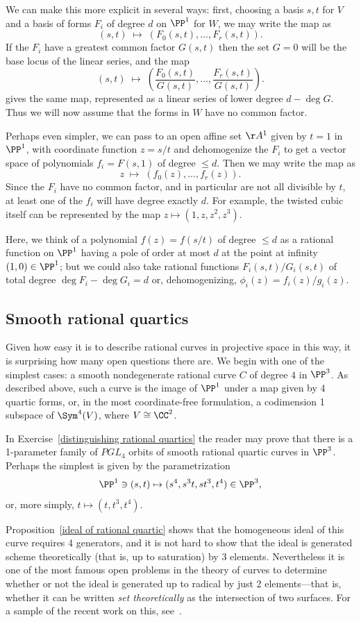 We can make this more explicit in several ways: first, choosing a basis $s,t$ for $V$ and a basis of forms $F_i$ of degree $d$ on $\PP^1$ for $W$, we may write the map as
$$
(s,t) \; \mapsto \; \left(F_0(s,t), \dots, F_r(s,t)\right).
$$
If the $F_i$ have a greatest common factor $G(s,t)$ then the set $G=0$ will be the base locus
of the linear series, and the map
$$
(s,t) \; \mapsto \; \left( \frac{F_0(s,t)}{G(s,t)}, \dots, \frac{F_r(s,t)}{G(s,t)}\right).
$$
gives the same map, represented as a linear series of lower degree $d-\deg G$. Thus we
will now assume that the forms in $W$ have no common factor.

Perhaps even simpler, we can pass to an open affine set $\AA^1$ given by $t=1$ in $\PP^1$, with coordinate function $z = s/t$ and
dehomogenize the $F_i$ to get a vector space of polynomials $f_i = F(s,1)$ of degree $\leq d$. Then we may write the
map as
$$
z \; \mapsto \; (f_0(z), \dots, f_r(z)).
$$
Since the $F_i$ have no common factor, and in particular are not all divisible by $t$, at least one of the
$f_i$ will have degree exactly $d$.
For example, the twisted cubic itself can be represented by the map
$z \mapsto (1, z,z^2,z^3)$.

Here, we think of a polynomial $f(z) = f(s/t)$ of degree $\leq d$ as a rational function on $\PP^1$ having
a pole of order at most $d$ at the point at infinity $(1,0)\in \PP^1$; but we could also take rational
functions $F_i(s,t)/G_i(s,t)$ of total degree $\deg F_i-\deg G_i = d$ or, dehomogenizing, $\phi_i(z) = f_i(z)/g_i(z)$.

\subsection *{Smooth rational quartics}
Given how easy it is to describe rational curves in projective space in this way, it is surprising how many open questions there are. We begin with
one of the simplest cases: a smooth nondegenerate rational curve $C$ of degree $4$ in $\PP^3$.
As described above, such a curve is the image of $\PP^1$ under a map given by 4 quartic forms,
or, in the most coordinate-free formulation, a codimension 1 subspace of $\Sym^4(V)$, where
$V\cong \CC^2$. 

\begin{example}
In Exercise~\ref{distinguishing rational quartics} the reader may prove that there is a 1-parameter family of 
$PGL_4$ orbits of smooth rational quartic curves in $\PP^3$. Perhaps the simplest is given by the parametrization 
$$
\PP^1 \ni (s,t) \mapsto (s^4, s^3t, st^3, t^4)\in \PP^3,
$$
or, more simply, $t\mapsto(t, t^3, t^4)$. 

Proposition~\ref{ideal of rational quartic} shows that the homogeneous ideal of this curve requires 4 generators, and it is not hard to show
that the ideal is generated scheme theoretically (that is, up to saturation) by 3 elements. Nevertheless it is
one of the most famous open problems in the theory of curves to determine whether or not the ideal
is generated up to radical by just 2 elements---that is, whether it
can be written \emph{set theoretically} as the intersection of two surfaces. For a sample of the recent
work on this, see~\cite{MR3356940}. 
\end{example}

